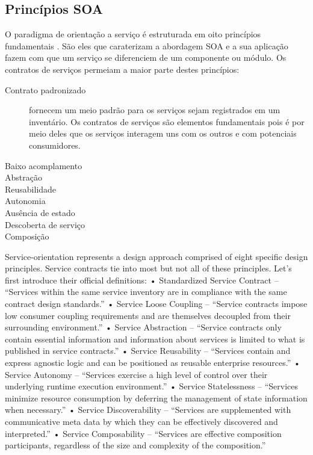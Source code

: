 \vspace{-6mm}

\subsection{Princípios SOA}
\label{PrincipiosSOA} 
\vspace{-6mm}

O paradigma de orientação a serviço é estruturada em oito princípios
fundamentais \cite{erl2009web}. São eles que caraterizam a abordagem SOA e a sua
aplicação fazem com que um serviço se diferenciem de um componente ou módulo. Os
contratos de serviços permeiam a maior parte destes princípios:

\begin{description}
\item[Contrato padronizado] fornecem um meio padrão para os serviços
sejam registrados em um inventário. Os contratos de serviços são elementos
fundamentais pois é por meio deles que os serviços interagem uns com os outros e
com potenciais consumidores. 

\item[Baixo acomplamento]

\item[Abstração]

\item[Reusabilidade]

\item[Autonomia]

\item[Ausência de estado]

\item[Descoberta de serviço]

\item[Composição]

\end{description}
 

Service-orientation represents a design approach comprised of eight specific design
principles. Service contracts tie into most but not all of these principles. Let’s first introduce
their official definitions:
• Standardized Service Contract – “Services within the same service inventory are in
compliance with the same contract design standards.”
• Service Loose Coupling – “Service contracts impose low consumer coupling
requirements and are themselves decoupled from their surrounding
environment.”
• Service Abstraction – “Service contracts only contain essential information and
information about services is limited to what is published in service contracts.”
• Service Reusability – “Services contain and express agnostic logic and can be positioned
as reusable enterprise resources.”
• Service Autonomy – “Services exercise a high level of control over their underlying
runtime execution environment.”
• Service Statelessness – “Services minimize resource consumption by deferring the
management of state information when necessary.”
• Service Discoverability – “Services are supplemented with communicative meta
data by which they can be effectively discovered and interpreted.”
• Service Composability – “Services are effective composition participants, regardless
of the size and complexity of the composition.”


